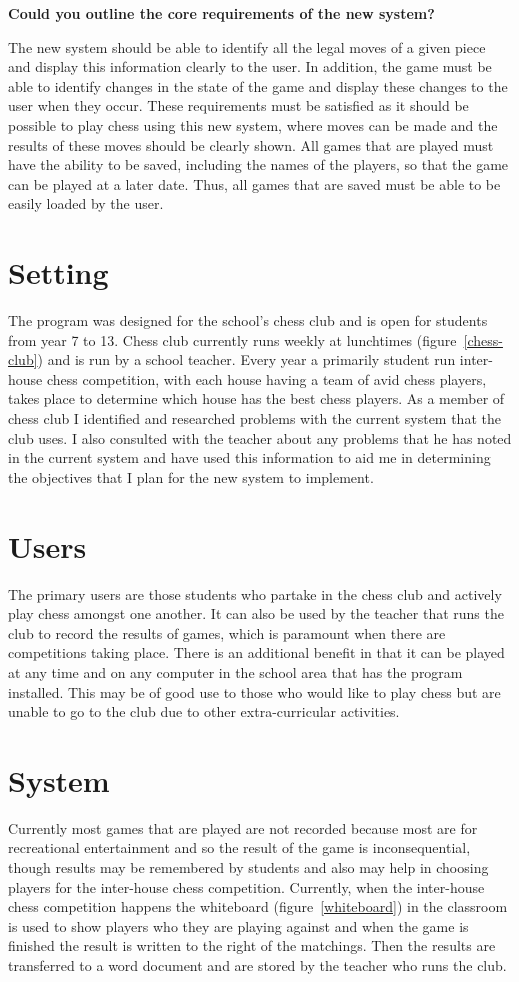 \textbf{Could you outline the core requirements of the new system?}

The new system should be able to identify all the legal moves of a given piece and display this information clearly to the user. In addition, the game must be able to identify changes in the state of the game and display these changes to the user when they occur. These requirements must be satisfied as it should be possible to play chess using this new system, where moves can be made and the results of these moves should be clearly shown. All games that are played must have the ability to be saved, including the names of the players, so that the game can be played at a later date. Thus, all games that are saved must be able to be easily loaded by the user.
\section{Setting}
The program was designed for the school's chess club and is open for students from year 7 to 13. Chess club currently runs weekly at lunchtimes (figure~\ref{chess-club}) and is run by a school teacher. Every year a primarily student run inter-house chess competition, with each house having a team of avid chess players, takes place to determine which house has the best chess players. As a member of chess club I identified and researched problems with the current system that the club uses. I also consulted with the teacher about any problems that he has noted in the current system and have used this information to aid me in determining the objectives that I plan for the new system to implement.
\section{Users}
The primary users are those students who partake in the chess club and actively play chess amongst one another. It can also be used by the teacher that runs the club to record the results of games, which is paramount when there are competitions taking place. There is an additional benefit in that it can be played at any time and on any computer in the school area that has the program installed. This may be of good use to those who would like to play chess but are unable to go to the club due to other extra-curricular activities.
\section{System}
Currently most games that are played are not recorded because most are for recreational entertainment and so the result of the game is inconsequential, though results may be remembered by students and also may help in choosing players for the inter-house chess competition. Currently, when the inter-house chess competition happens the whiteboard (figure~\ref{whiteboard}) in the classroom is used to show players who they are playing against and when the game is finished the result is written to the right of the matchings. Then the results are transferred to a word document and are stored by the teacher who runs the club.
